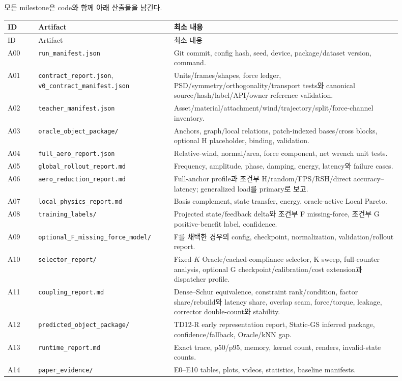 \documentclass[10pt,a4paper]{article}
\newcommand{\artifact}[1]{\textcolor{ProgressBlue}{\nolinkurl{#1}}}
\begin{document}
모든 milestone은 code와 함께 아래 산출물을 남긴다.

\begin{longtable}{L{0.075\linewidth}L{0.31\linewidth}L{0.52\linewidth}}
\toprule
ID & Artifact & 최소 내용 \\
\midrule
\endfirsthead
\toprule
ID & Artifact & 최소 내용 \\
\midrule
\endhead
A00 & \artifact{run_manifest.json} & Git commit, config hash, seed, device, package/dataset version, command. \\
A01 & \artifact{contract_report.json}, \artifact{v0_contract_manifest.json} & Units/frames/shapes, force ledger, PSD/symmetry/orthogonality/transport tests와 canonical source/hash/label/API/owner reference validation. \\
A02 & \artifact{teacher_manifest.json} & Asset/material/attachment/wind/trajectory/split/force-channel inventory. \\
A03 & \artifact{oracle_object_package/} & Anchors, graph/local relations, patch-indexed bases/cross blocks, optional H placeholder, binding, validation. \\
A04 & \artifact{full_aero_report.json} & Relative-wind, normal/area, force component, net wrench unit tests. \\
A05 & \artifact{global_rollout_report.md} & Frequency, amplitude, phase, damping, energy, latency와 failure cases. \\
A06 & \artifact{aero_reduction_report.md} & Full-anchor profile과 조건부 H/random/FPS/RSH/direct accuracy--latency; generalized load를 primary로 보고. \\
A07 & \artifact{local_physics_report.md} & Basis complement, state transfer, energy, oracle-active Local Pareto. \\
A08 & \artifact{training_labels/} & Projected state/feedback delta와 조건부 F missing-force, 조건부 G positive-benefit label, confidence. \\
A09 & \artifact{optional_F_missing_force_model/} & F를 채택한 경우의 config, checkpoint, normalization, validation/rollout report. \\
A10 & \artifact{selector_report/} & Fixed-\(K\) Oracle/cached-compliance selector, K sweep, full-counter analysis, optional G checkpoint/calibration/cost extension과 dispatcher profile. \\
A11 & \artifact{coupling_report.md} & Dense--Schur equivalence, constraint rank/condition, factor share/rebuild와 latency share, overlap seam, force/torque, leakage, corrector double-count와 stability. \\
A12 & \artifact{predicted_object_package/} & TD12-R early representation report, Static-GS inferred package, confidence/fallback, Oracle/kNN gap. \\
A13 & \artifact{runtime_report.md} & Exact trace, p50/p95, memory, kernel count, renders, invalid-state counts. \\
A14 & \artifact{paper_evidence/} & E0--E10 tables, plots, videos, statistics, baseline manifests. \\
\bottomrule
\end{longtable}
\end{document}
